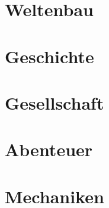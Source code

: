 \documentclass[a4paper,12pt,%
headsepline,%
numbers=noenddot,%
]{scrreprt}
\begin{document}
\part{Weltenbau}
 





\part{Geschichte}


\part{Gesellschaft}







\part{Abenteuer}




\part{Mechaniken}





\end{document}
